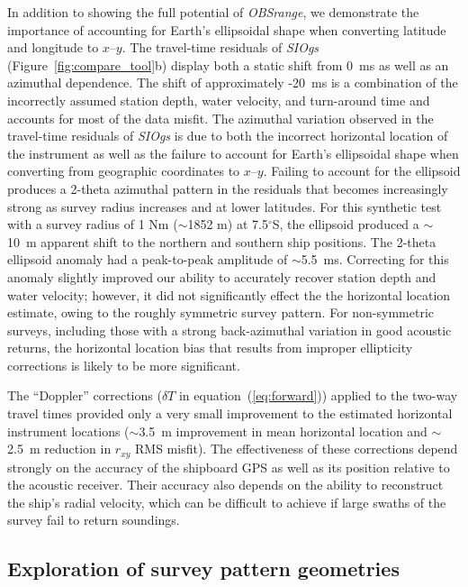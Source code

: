 In addition to showing the full potential of \textit{OBSrange}, we demonstrate the importance of accounting for Earth's ellipsoidal shape when converting latitude and longitude to $x$--$y$. The travel-time residuals of \textit{SIOgs} (Figure~\ref{fig:compare_tool}b) display both a static shift from 0~ms as well as an azimuthal dependence. The shift of approximately -20~ms is a combination of the incorrectly assumed station depth, water velocity, and turn-around time and accounts for most of the data misfit. The azimuthal variation observed in the travel-time residuals of \textit{SIOgs} is due to both the incorrect horizontal location of the instrument as well as the failure to account for Earth's ellipsoidal shape when converting from geographic coordinates to $x$--$y$. Failing to account for the ellipsoid produces a 2-theta azimuthal pattern in the residuals that becomes increasingly strong as survey radius increases and at lower latitudes. For this synthetic test with a survey radius of 1 Nm ($\sim$1852 m) at 7.5$^{\circ}$S, the ellipsoid produced a $\sim$10~m apparent shift to the northern and southern ship positions. The 2-theta ellipsoid anomaly had a peak-to-peak amplitude of $\sim$5.5~ms. Correcting for this anomaly slightly improved our ability to accurately recover station depth and water velocity; however, it did not significantly effect the the horizontal location estimate, owing to the roughly symmetric survey pattern. For non-symmetric surveys, including those with a strong back-azimuthal variation in good acoustic returns, the horizontal location bias that results from improper ellipticity corrections is likely to be more significant.

The ``Doppler'' corrections ($\delta T$ in equation~(\ref{eq:forward})) applied to the two-way travel times provided only a very small improvement to the estimated horizontal instrument locations ($\sim$3.5~m improvement in mean horizontal location and $\sim$2.5~m reduction in $r_{xy}$ RMS misfit). The effectiveness of these corrections depend strongly on the accuracy of the shipboard GPS as well as its position relative to the acoustic receiver. Their accuracy also depends on the ability to reconstruct the ship's radial velocity, which can be difficult to achieve if large swaths of the survey fail to return soundings.


\subsection{Exploration of survey pattern geometries} \label{sec:surv_geom_tests}

